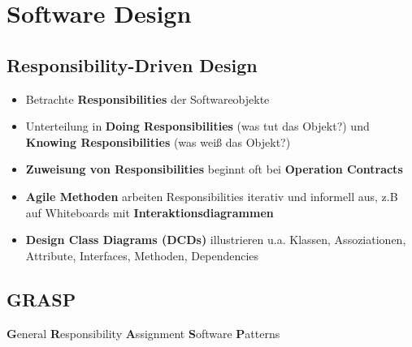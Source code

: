 \section{Software Design}
\label{sd:sec:software_design}

\subsection{Responsibility-Driven Design}
\label{sd:sub:responsibility_driven_design}

\begin{itemize}
	\item Betrachte \textbf{Responsibilities} der Softwareobjekte
	\item Unterteilung in \textbf{Doing Responsibilities} (was tut das Objekt?) und \textbf{Knowing Responsibilities} (was weiß das Objekt?)
	\item \textbf{Zuweisung von Responsibilities} beginnt oft bei \textbf{Operation Contracts}
	\item \textbf{Agile Methoden} arbeiten Responsibilities iterativ und informell aus, z.B auf Whiteboards mit \textbf{Interaktionsdiagrammen}
	\item \textbf{Design Class Diagrams (DCDs)} illustrieren u.a. Klassen, Assoziationen, Attribute, Interfaces, Methoden, Dependencies
\end{itemize}

\subsection{GRASP}
\label{sd:sub:grasp}

\textbf{G}eneral \textbf{R}esponsibility \textbf{A}ssignment \textbf{S}oftware \textbf{P}atterns

